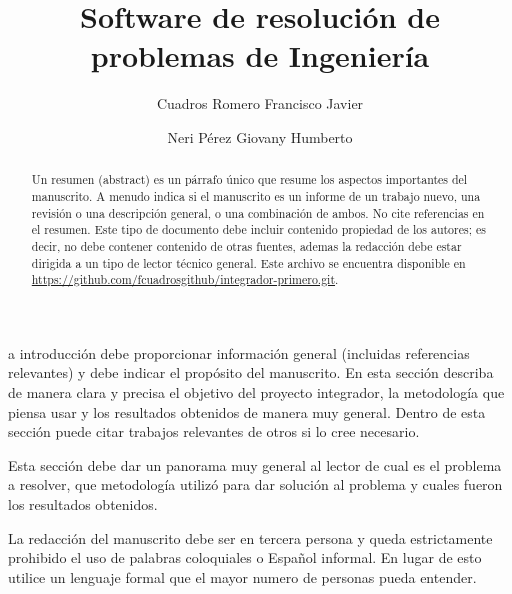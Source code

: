 \documentclass{IEEEcsmag}
\begin{document}

\title{Software de resolución de problemas de Ingeniería }

\author{Cuadros Romero Francisco Javier}

\author{Neri Pérez Giovany Humberto}



\begin{abstract}
Un resumen (abstract) es un párrafo único que resume los aspectos importantes del manuscrito. A menudo indica si el manuscrito es un informe de un trabajo nuevo, una revisión o una descripción general, o una combinación de ambos. No cite referencias en el resumen. Este tipo de documento debe incluir contenido propiedad de los autores; es decir, no debe contener contenido de otras fuentes, ademas la redacción debe  estar dirigida a un tipo de lector técnico general. Este archivo se encuentra disponible en \href{https://github.com/fcuadrosgithub/integrador-primero.git}{https://github.com/fcuadrosgithub/integrador-primero.git}.
\end{abstract}

\maketitle
{}a introducción debe proporcionar información general (incluidas referencias relevantes) y debe indicar el propósito del manuscrito. En esta sección describa de manera clara y precisa el objetivo del proyecto integrador, la metodología que piensa usar y los resultados obtenidos de manera muy general. Dentro de esta sección puede citar trabajos relevantes de otros si lo cree necesario.

Esta sección debe dar un panorama muy general al lector de cual es el problema a resolver, que metodología utilizó para dar solución al problema y cuales fueron los resultados obtenidos. 

La redacción del manuscrito debe ser en tercera persona y queda estrictamente prohibido el uso de palabras coloquiales o Español informal. En lugar de esto utilice un lenguaje formal que el mayor numero de personas pueda entender.
\end{document}
